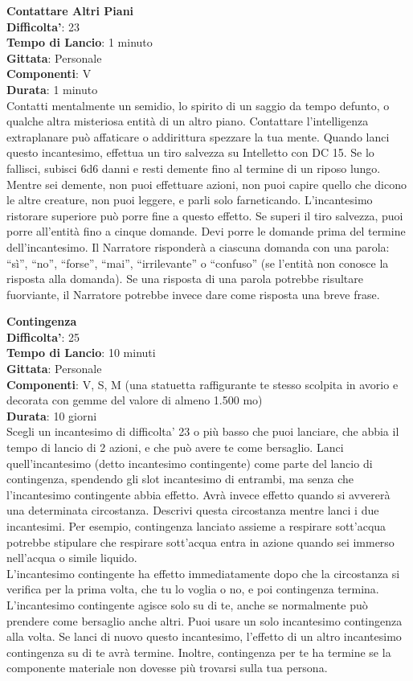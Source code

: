 \begin{multicols}{2}
\medskip\textbf{Contattare Altri Piani}\\
\textbf{Difficolta'}: 23\\
\textbf{Tempo di Lancio}: 1 minuto\\
\textbf{Gittata}: Personale\\
\textbf{Componenti}: V\\
\textbf{Durata}: 1 minuto\\
Contatti mentalmente un semidio, lo spirito di un saggio da tempo defunto, o qualche altra misteriosa entità di un altro piano. Contattare l’intelligenza extraplanare può affaticare o addirittura spezzare la tua mente. Quando lanci questo incantesimo, effettua un tiro salvezza su Intelletto con DC 15. Se lo fallisci, subisci 6d6 danni e resti demente fino al termine di un riposo lungo. Mentre sei demente, non puoi effettuare azioni, non puoi capire quello che dicono le altre creature, non puoi leggere, e parli solo farneticando. L’incantesimo ristorare superiore può porre fine a questo effetto. Se superi il tiro salvezza, puoi porre all’entità fino a cinque domande. Devi porre le domande prima del termine dell’incantesimo. Il Narratore risponderà a ciascuna domanda con una parola: “sì”, “no”, “forse”, “mai”, “irrilevante” o “confuso” (se l’entità non conosce la risposta alla domanda). Se una risposta di una parola
potrebbe risultare fuorviante, il Narratore potrebbe invece dare come risposta una breve frase.


\medskip\textbf{Contingenza}\\
\textbf{Difficolta'}: 25\\
\textbf{Tempo di Lancio}: 10 minuti\\
\textbf{Gittata}: Personale\\
\textbf{Componenti}: V, S, M (una statuetta raffigurante te stesso scolpita in avorio e decorata con gemme del valore di almeno 1.500 mo)\\
\textbf{Durata}: 10 giorni\\
Scegli un incantesimo di difficolta' 23 o più basso che puoi lanciare, che abbia il tempo di lancio di 2 azioni, e che può avere te come bersaglio. Lanci quell’incantesimo (detto incantesimo contingente) come parte del lancio di contingenza, spendendo gli slot incantesimo di entrambi, ma senza che l’incantesimo contingente abbia effetto. Avrà invece effetto quando si avvererà una determinata circostanza. Descrivi questa circostanza mentre lanci i due incantesimi. Per esempio, contingenza lanciato assieme a respirare sott’acqua potrebbe stipulare che respirare sott’acqua entra in azione quando sei immerso nell’acqua o simile liquido.\\
L’incantesimo contingente ha effetto immediatamente dopo che la circostanza si verifica per la prima volta, che tu lo voglia o no, e poi contingenza termina. L’incantesimo contingente agisce solo su di te, anche se normalmente può prendere come bersaglio anche altri. Puoi usare un solo incantesimo contingenza alla volta. Se lanci di nuovo questo incantesimo, l’effetto di un altro incantesimo contingenza su di te avrà termine. Inoltre, contingenza per te ha termine se la componente materiale non dovesse più trovarsi sulla tua persona.



\end{multicols}

